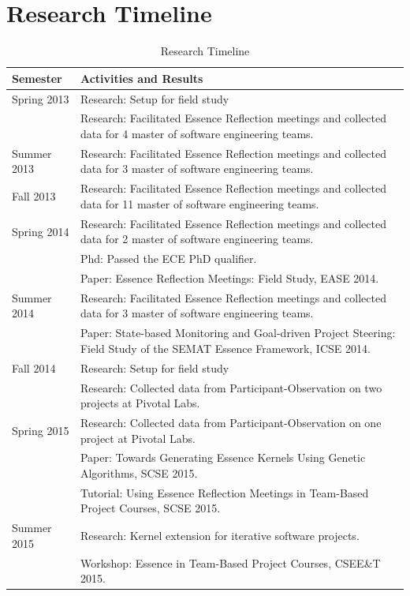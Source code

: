 \documentclass[preprint,12pt,3p]{elsarticle}
\begin{document}
\appendix
\section{Research Timeline}
\label{appendix}

\begin{table}[H]
\caption{Research Timeline}
\label{ResearchTimeline}
\centering
\begin{tabular}{|p{1.00in}|p{5.00in}|}
\hline
Semester    & Activities and Results  \\ \hline
Spring 2013 & Research: Setup for field study \\
            & Research: Facilitated Essence Reflection meetings and collected data for 4 master of software engineering teams. \\ \hline
Summer 2013 & Research: Facilitated Essence Reflection meetings and collected data for 3 master of software engineering teams.  \\ \hline
Fall 2013   & Research: Facilitated Essence Reflection meetings and collected data for 11 master of software engineering teams.  \\ \hline
Spring 2014 & Research: Facilitated Essence Reflection meetings and collected data for 2 master of software engineering teams.\\ 
            & Phd: Passed the ECE PhD qualifier.\\ 
            & Paper: Essence Reflection Meetings: Field Study, EASE 2014. \cite{EASE2014} \\ \hline
Summer 2014 & Research: Facilitated Essence Reflection meetings and collected data for 3 master of software engineering teams.\\ 
            & Paper: State-based Monitoring and Goal-driven Project Steering: Field Study of the SEMAT Essence Framework, ICSE 2014. \cite{ICSE2014} \\ \hline
Fall 2014   & Research: Setup for field study \\
            & Research: Collected data from Participant-Observation on two projects at Pivotal Labs.  \\ \hline
Spring 2015 & Research: Collected data from Participant-Observation on one project at Pivotal Labs.\\ 
            & Paper: Towards Generating Essence Kernels Using Genetic Algorithms, SCSE 2015. \cite{SCSE2015} \\ 
            & Tutorial: Using Essence Reflection Meetings in Team-Based Project Courses, SCSE 2015.\cite{SCSE2015Tutorial} \\ \hline
Summer 2015 & Research: Kernel extension for iterative software projects.\\ 
            & Workshop: Essence in Team-Based Project Courses, CSEE\&T 2015. \cite{CSEET2015Workshop} \\ \hline                     
\end{tabular}
\end{table}
\end{document}
